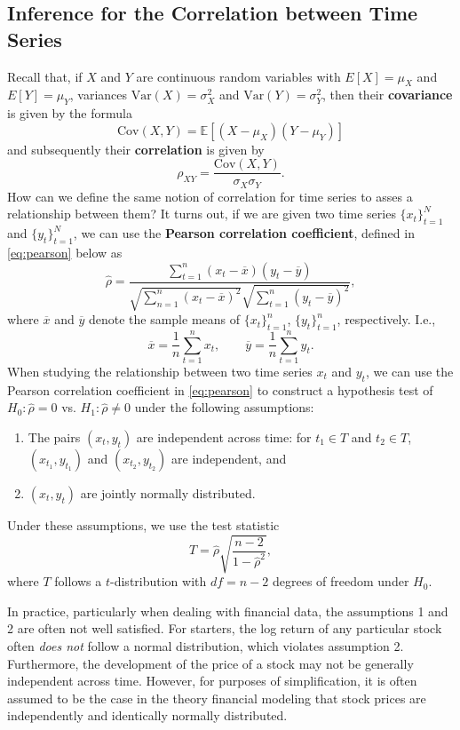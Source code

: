 \documentclass[12pt]{article}
\begin{document}
	\subsection{Inference for the Correlation between Time Series}
	Recall that, if $X$ and $Y$ are continuous random variables with $E[X] = \mu_X$ and $E[Y] = \mu_Y$, variances $\mathrm{Var}(X) = \sigma_X^2$ and $\mathrm{Var}(Y) = \sigma_Y^2$, then their \textbf{covariance} is given by the formula $$\mathrm{Cov}(X, Y) = \mathbb{E}[(X - \mu_X)(Y - \mu_Y)]$$ and subsequently their \textbf{correlation} is given by $$\rho_{XY} = \frac{\mathrm{Cov}(X, Y)}{\sigma_X \sigma_Y}.$$ How can we define the same notion of correlation for time series to asses a relationship between them?  It turns out, if we are given two time series $\{x_t\}_{t = 1}^N$ and $\{y_t\}_{t = 1}^N$, we can use the \textbf{Pearson correlation coefficient}, defined in \autoref{eq:pearson} below as
		\begin{equation}
			\label{eq:pearson}
			\hat{\rho} = \frac{\sum_{t  = 1}^n (x_t - \overline{x})(y_t - \overline{y})}{\sqrt{\sum_{n = 1}^n (x_t - \overline{x})^2} \sqrt{\sum_{t = 1}^n (y_t - \overline y)^2}},
		\end{equation}
	where $\overline{x}$ and $\overline{y}$ denote the sample means of $\{x_t\}_{t = 1}^n$, $\{y_t\}_{t = 1}^n$, respectively. I.e., $$\overline{x} = \frac{1}{n} \sum_{t = 1}^n x_t, \qquad \overline{y} = \frac{1}{n} \sum_{t = 1}^n y_t.$$
	When studying the relationship between two time series $x_t$ and $y_t$, we can use the Pearson correlation coefficient in \autoref{eq:pearson} to construct a hypothesis test of $H_0 : \hat{\rho} = 0$ vs. $H_1: \hat{\rho} \neq 0$ under the following assumptions:
		\begin{enumerate}
			\item The pairs $(x_t, y_t)$ are independent across time: for $t_1 \in T$ and $t_2 \in T$, $(x_{t_1}, y_{t_1})$ and $(x_{t_2}, y_{t_2})$ are independent, and
			\item $(x_t, y_t)$ are jointly normally distributed.
		\end{enumerate}
	Under these assumptions, we use the test statistic 
		\begin{equation}
			\label{eq:pearsonTest}
			T = \hat{\rho} \sqrt{\frac{n - 2}{1 - \hat{\rho}^2}},
		\end{equation}
	where $T$ follows a $t$-distribution with $df = n - 2$ degrees of freedom under $H_0$. 
	
	
	In practice, particularly when dealing with financial data, the assumptions 1 and 2 are often not well satisfied. For starters, the log return of any particular stock often \textit{does not} follow a normal distribution, which violates assumption 2. Furthermore, the development of the price of a stock may not be generally independent across time. However, for purposes of simplification, it is often assumed to be the case in the theory financial modeling that stock prices are independently and identically normally distributed. 
 	
\end{document}

